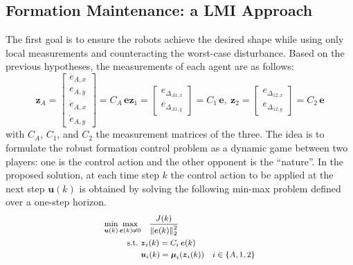 \documentclass{ifacconf}
\begin{document}
\subsection{Formation Maintenance: a LMI Approach}
The first goal is to ensure the robots achieve the desired shape 
while using only local measurements 
and counteracting the worst-case disturbance.
Based on the previous hypotheses, the measurements of 
each agent are as follows:
\begin{subequations}
    \begin{equation}
    \boldsymbol{z}_A = \begin{bmatrix}
        e_{A,x}  \\ e_{A,y} \\ \dot{e}_{A,x} \\ \dot{e}_{A,y}
    \end{bmatrix}= C_A \, \boldsymbol{e}
    \label{eq:measurement_drone}
\end{equation}
\begin{equation}
    \boldsymbol{z}_1 = \begin{bmatrix}
        e_{\Delta_{A1,x}} \\ e_{\Delta_{A1,y}}
    \end{bmatrix} = C_1 \, \boldsymbol{e}, \  
     \boldsymbol{z}_2 = \begin{bmatrix}
        e_{\Delta_{12,x}} \\ e_{\Delta_{12,y}}
    \end{bmatrix} = C_2 \, \boldsymbol{e}
\end{equation}
\label{eq:airground-continous_time-measurement}
\end{subequations}
with $C_A$, $C_1$, and $C_2$ the measurement matrices of the three.
The idea is to formulate the robust formation control 
problem as a dynamic game between two players: 
one is the control action and the other opponent is 
the ``nature''.
In the proposed solution, at each time step $k$ the control 
action to be applied at the next step $\boldsymbol{u}(k)$
is obtained by solving the following min-max problem 
defined over a one-step horizon.
\begin{equation}
\footnotesize
\begin{aligned}
    \min_{\boldsymbol{u}(k)} \max_{\boldsymbol{e}(k) \neq 0} &  \quad 
    \frac{J(k)}{\left\lVert \boldsymbol{e}(k)\right\rVert^2_2} \\
    \textrm{s.t.} \  &\boldsymbol{z}_i(k) = C_i \, \boldsymbol{e}(k) \\
    \quad & \boldsymbol{u}_{i}(k) = \boldsymbol{\mu}_i(\boldsymbol{z}_i(k)) \quad i \in \{A,1,2\} \\
\end{aligned}
\end{equation}
\end{document}
